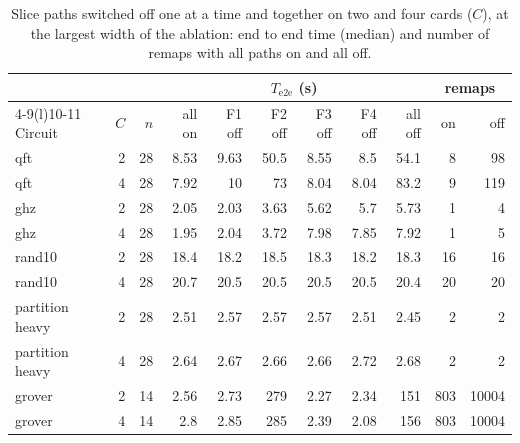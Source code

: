 \documentclass[pdflatex,sn-mathphys-num]{sn-jnl}
\theoremstyle{thmstyleone}
\theoremstyle{thmstylethree}
\begin{document}
\begin{table}[t]
\caption{Slice paths switched off one at a time and together on two and four cards ($C$), at the largest width of the
ablation: end to end time (median) and number of remaps with all paths on and all off.}\label{tab:ablation}
\begin{tabular}{@{}lrrrrrrrrrr@{}}
\toprule
 & & & \multicolumn{6}{c}{$T_{\mathrm{e2e}}$ (s)} & \multicolumn{2}{c}{remaps} \\
\cmidrule(lr){4-9}\cmidrule(l){10-11}
Circuit & $C$ & $n$ & all on & F1 off & F2 off & F3 off & F4 off & all off & on & off \\
\midrule
qft & 2 & 28 & 8.53 & 9.63 & 50.5 & 8.55 & 8.5 & 54.1 & 8 & 98 \\
qft & 4 & 28 & 7.92 & 10 & 73 & 8.04 & 8.04 & 83.2 & 9 & 119 \\
ghz & 2 & 28 & 2.05 & 2.03 & 3.63 & 5.62 & 5.7 & 5.73 & 1 & 4 \\
ghz & 4 & 28 & 1.95 & 2.04 & 3.72 & 7.98 & 7.85 & 7.92 & 1 & 5 \\
rand10 & 2 & 28 & 18.4 & 18.2 & 18.5 & 18.3 & 18.2 & 18.3 & 16 & 16 \\
rand10 & 4 & 28 & 20.7 & 20.5 & 20.5 & 20.5 & 20.5 & 20.4 & 20 & 20 \\
partition heavy & 2 & 28 & 2.51 & 2.57 & 2.57 & 2.57 & 2.51 & 2.45 & 2 & 2 \\
partition heavy & 4 & 28 & 2.64 & 2.67 & 2.66 & 2.66 & 2.72 & 2.68 & 2 & 2 \\
grover & 2 & 14 & 2.56 & 2.73 & 279 & 2.27 & 2.34 & 151 & 803 & 10004 \\
grover & 4 & 14 & 2.8 & 2.85 & 285 & 2.39 & 2.08 & 156 & 803 & 10004 \\
\bottomrule
\end{tabular}
\end{table}
\end{document}
